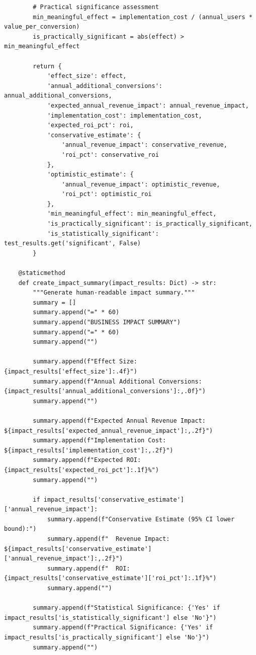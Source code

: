 \begin{lstlisting}
        # Practical significance assessment
        min_meaningful_effect = implementation_cost / (annual_users * value_per_conversion)
        is_practically_significant = abs(effect) > min_meaningful_effect

        return {
            'effect_size': effect,
            'annual_additional_conversions': annual_additional_conversions,
            'expected_annual_revenue_impact': annual_revenue_impact,
            'implementation_cost': implementation_cost,
            'expected_roi_pct': roi,
            'conservative_estimate': {
                'annual_revenue_impact': conservative_revenue,
                'roi_pct': conservative_roi
            },
            'optimistic_estimate': {
                'annual_revenue_impact': optimistic_revenue,
                'roi_pct': optimistic_roi
            },
            'min_meaningful_effect': min_meaningful_effect,
            'is_practically_significant': is_practically_significant,
            'is_statistically_significant': test_results.get('significant', False)
        }

    @staticmethod
    def create_impact_summary(impact_results: Dict) -> str:
        """Generate human-readable impact summary."""
        summary = []
        summary.append("=" * 60)
        summary.append("BUSINESS IMPACT SUMMARY")
        summary.append("=" * 60)
        summary.append("")

        summary.append(f"Effect Size: {impact_results['effect_size']:.4f}")
        summary.append(f"Annual Additional Conversions: {impact_results['annual_additional_conversions']:,.0f}")
        summary.append("")

        summary.append(f"Expected Annual Revenue Impact: ${impact_results['expected_annual_revenue_impact']:,.2f}")
        summary.append(f"Implementation Cost: ${impact_results['implementation_cost']:,.2f}")
        summary.append(f"Expected ROI: {impact_results['expected_roi_pct']:.1f}%")
        summary.append("")

        if impact_results['conservative_estimate']['annual_revenue_impact']:
            summary.append(f"Conservative Estimate (95% CI lower bound):")
            summary.append(f"  Revenue Impact: ${impact_results['conservative_estimate']['annual_revenue_impact']:,.2f}")
            summary.append(f"  ROI: {impact_results['conservative_estimate']['roi_pct']:.1f}%")
            summary.append("")

        summary.append(f"Statistical Significance: {'Yes' if impact_results['is_statistically_significant'] else 'No'}")
        summary.append(f"Practical Significance: {'Yes' if impact_results['is_practically_significant'] else 'No'}")
        summary.append("")


\end{lstlisting}
